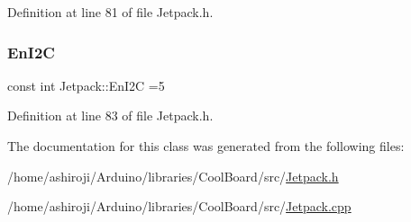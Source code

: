 Definition at line 81 of file Jetpack.\+h.

\mbox{\label{class_jetpack_a81df984fb4cea98c71aa1a1cfcdfe814}} 
\subsubsection{\texorpdfstring{En\+I2C}{EnI2C}}
{\footnotesize\ttfamily const int Jetpack\+::\+En\+I2C =5\hspace{0.3cm}{\ttfamily [private]}}



Definition at line 83 of file Jetpack.\+h.



The documentation for this class was generated from the following files\+:\begin{DoxyCompactItemize}
\item 
/home/ashiroji/\+Arduino/libraries/\+Cool\+Board/src/\hyperlink{_jetpack_8h}{Jetpack.\+h}\item 
/home/ashiroji/\+Arduino/libraries/\+Cool\+Board/src/\hyperlink{_jetpack_8cpp}{Jetpack.\+cpp}\end{DoxyCompactItemize}
